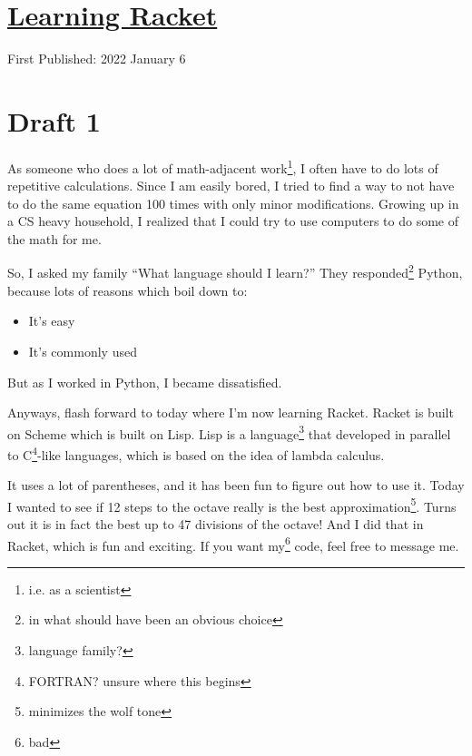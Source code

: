 \documentclass[12pt]{article}[titlepage]
\newcommand{\say}[1]{``#1''}
\newcommand{\1}{\={a}}
\newcommand{\2}{\={e}}
\newcommand{\3}{\={\i}}
\newcommand{\4}{\=o}
\newcommand{\5}{\=u}
\newcommand{\6}{\={A}}
\renewcommand{\,}{\textsuperscript{,}}
\begin{document}
\doublespacing
\section{\href{learning-racket.html}{Learning Racket}}
First Published: 2022 January 6
\section{Draft 1}
As someone who does a lot of math-adjacent work\footnote{i.e. as a scientist}, I often have to do lots of repetitive calculations.
Since I am easily bored, I tried to find a way to not have to do the same equation 100 times with only minor modifications.
Growing up in a CS heavy household, I realized that I could try to use computers to do some of the math for me.

So, I asked my family \say{What language should I learn?}
They responded\footnote{in what should have been an obvious choice} Python, because lots of reasons which boil down to:
\begin{itemize}
\item It's easy
\item It's commonly used
\end{itemize}
But as I worked in Python, I became dissatisfied.

Anyways, flash forward to today where I'm now learning Racket.
Racket is built on Scheme which is built on Lisp.
Lisp is a language\footnote{language family?} that developed in parallel to C\footnote{FORTRAN? unsure where this begins}-like languages, which is based on the idea of lambda calculus.

It uses a lot of parentheses, and it has been fun to figure out how to use it.
Today I wanted to see if 12 steps to the octave really is the best approximation\footnote{minimizes the wolf tone}.
Turns out it is in fact the best up to 47 divisions of the octave!
And I did that in Racket, which is fun and exciting.
If you want my\footnote{bad} code, feel free to message me.
\end{document}
